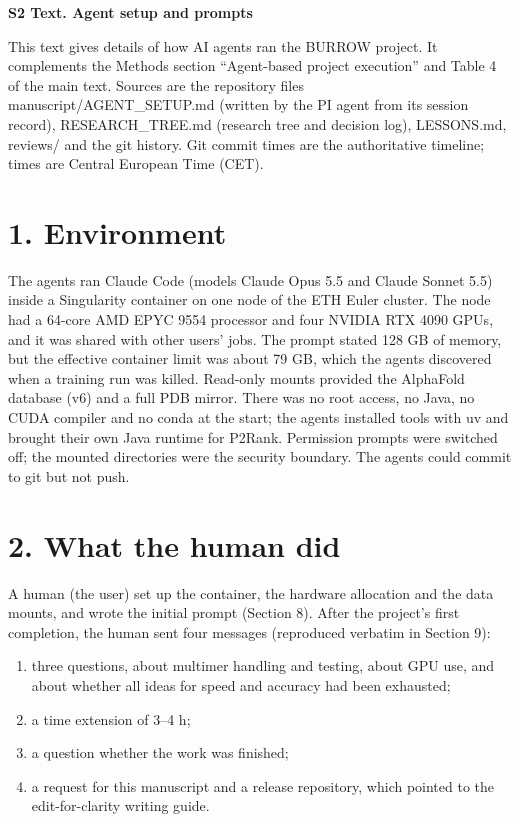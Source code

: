 \documentclass[10pt,letterpaper]{article}
\begin{document}
\begin{flushleft}
{\Large\textbf{S2 Text. Agent setup and prompts}}
\end{flushleft}
This text gives details of how AI agents ran the BURROW project. It complements the Methods section ``Agent-based project execution'' and Table 4 of the main text. Sources are the repository files manuscript/AGENT\_SETUP.md (written by the PI agent from its session record), RESEARCH\_TREE.md (research tree and decision log), LESSONS.md, reviews/ and the git history. Git commit times are the authoritative timeline; times are Central European Time (CET).

\section*{1. Environment}

The agents ran Claude Code (models Claude Opus 5.5 and Claude Sonnet 5.5) inside a Singularity container on one node of the ETH Euler cluster. The node had a 64-core AMD EPYC 9554 processor and four NVIDIA RTX 4090 GPUs, and it was shared with other users' jobs. The prompt stated 128 GB of memory, but the effective container limit was about 79 GB, which the agents discovered when a training run was killed. Read-only mounts provided the AlphaFold database (v6) and a full PDB mirror. There was no root access, no Java, no CUDA compiler and no conda at the start; the agents installed tools with uv and brought their own Java runtime for P2Rank. Permission prompts were switched off; the mounted directories were the security boundary. The agents could commit to git but not push.

\section*{2. What the human did}

A human (the user) set up the container, the hardware allocation and the data mounts, and wrote the initial prompt (Section 8). After the project's first completion, the human sent four messages (reproduced verbatim in Section 9):

\begin{enumerate}
\item three questions, about multimer handling and testing, about GPU use, and about whether all ideas for speed and accuracy had been exhausted;
\item a time extension of 3--4 h;
\item a question whether the work was finished;
\item a request for this manuscript and a release repository, which pointed to the edit-for-clarity writing guide.
\end{enumerate}
\end{document}
